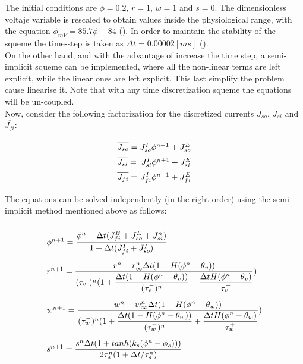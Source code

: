 The initial conditions are $\phi = 0.2$, $r = 1$, $w = 1$ and $s = 0$. The dimensionless voltaje variable is rescaled to obtain values inside the physiological range, with the equation $\phi_{mV} = 85.7 \phi - 84$ (). In order to maintain the stability of the squeme the time-step is taken as $\Delta t = 0.00002 [ms]$ (). \\

On the other hand, and with the advantage of increase the time step, a semi-implicit squeme can be implemented, where all the non-linear terms are left explicit, while the linear ones are left explicit. This last simplify the problem cause linearise it. Note that with any time discretization squeme the equations will be un-coupled. \\

Now, consider the following factorization for the discretized currents $\overline{J_{so}}$, $\overline{J_{si}}$ and $\overline{J_{fi}}$:

\begin{equation}
\arraycolsep=1.4pt\def\arraystretch{1.5}
\begin{array}{lr}
\overline{J_{so}} = & J_{so}^I \phi^{n+1} + J_{so}^E \\
\overline{J_{si}} = & J_{si}^I \phi^{n+1} + J_{si}^E \\
\overline{J_{fi}} = & J_{fi}^I \phi^{n+1} + J_{fi}^E
\end{array}
\end{equation}

The equations can be solved independently (in the right order) using the semi-implicit method mentioned above as follows:

\begin{equation}
\arraycolsep=1.4pt\def\arraystretch{2.8}
\begin{array}{l}
\phi^{n + 1} =  \dfrac{\phi^n - \Delta t (J_{fi}^E + J_{so}^E + J_{si}^n)}{1 + \Delta t (J_{fi}^I + J_{so}^I)} \\ 
r^{n+1} =  \dfrac{r^n + r_{\infty}^n \Delta t (1 - H(\phi^n - \theta_v))}{(\tau_v^-)^n (1 + \dfrac{\Delta t (1 - H(\phi^n - \theta_v))}{(\tau_v^-)^n} + \dfrac{\Delta t H(\phi^n - \theta_v)}{\tau_v^+}})  \\
w^{n+1} = \dfrac{w^n + w_{\infty}^n \Delta t (1 - H(\phi^n - \theta_w))}{(\tau_w^-)^n (1 + \dfrac{\Delta t (1 - H(\phi^n - \theta_w))}{(\tau_w^-)^n} + \dfrac{\Delta t H(\phi^n - \theta_w)}{\tau_w^+}})  \\
s^{n+1} = \dfrac{s^n \Delta t (1 + tanh(k_s (\phi^n - \phi_s)))}{2 \tau_s^n (1 + \Delta t / \tau_s^n)}
\end{array} \label{eq:mde_min_imp}
\end{equation}

